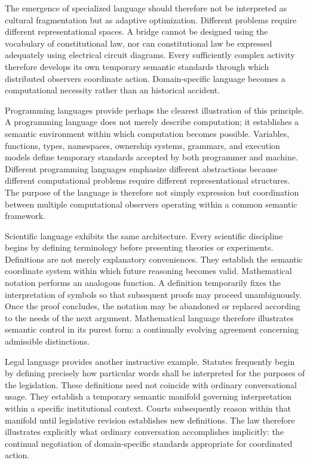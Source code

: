 \documentclass[12pt,a4paper]{article}
\begin{document}
The emergence of specialized language should therefore not be interpreted as cultural fragmentation but as adaptive optimization. Different problems require different representational spaces. A bridge cannot be designed using the vocabulary of constitutional law, nor can constitutional law be expressed adequately using electrical circuit diagrams. Every sufficiently complex activity therefore develops its own temporary semantic standards through which distributed observers coordinate action. Domain-specific language becomes a computational necessity rather than an historical accident.

Programming languages provide perhaps the clearest illustration of this principle. A programming language does not merely describe computation; it establishes a semantic environment within which computation becomes possible. Variables, functions, types, namespaces, ownership systems, grammars, and execution models define temporary standards accepted by both programmer and machine. Different programming languages emphasize different abstractions because different computational problems require different representational structures. The purpose of the language is therefore not simply expression but coordination between multiple computational observers operating within a common semantic framework.

Scientific language exhibits the same architecture. Every scientific discipline begins by defining terminology before presenting theories or experiments. Definitions are not merely explanatory conveniences. They establish the semantic coordinate system within which future reasoning becomes valid. Mathematical notation performs an analogous function. A definition temporarily fixes the interpretation of symbols so that subsequent proofs may proceed unambiguously. Once the proof concludes, the notation may be abandoned or replaced according to the needs of the next argument. Mathematical language therefore illustrates semantic control in its purest form: a continually evolving agreement concerning admissible distinctions.

Legal language provides another instructive example. Statutes frequently begin by defining precisely how particular words shall be interpreted for the purposes of the legislation. These definitions need not coincide with ordinary conversational usage. They establish a temporary semantic manifold governing interpretation within a specific institutional context. Courts subsequently reason within that manifold until legislative revision establishes new definitions. The law therefore illustrates explicitly what ordinary conversation accomplishes implicitly: the continual negotiation of domain-specific standards appropriate for coordinated action.
\end{document}

